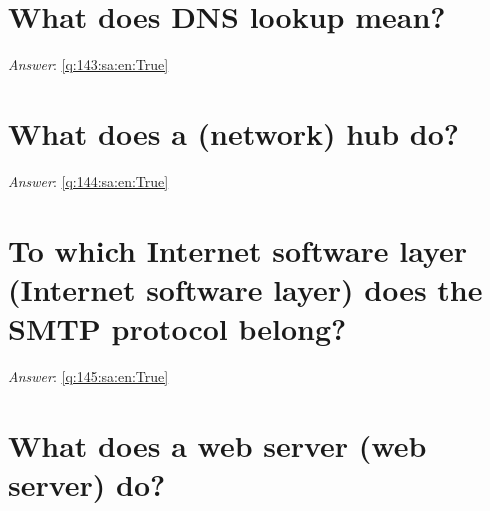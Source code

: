\documentclass[a4paper,11pt,oneside]{book}
\begin{document}
\begin{sloppypar}
\section{What does DNS lookup mean?}

\label{q:143:sa:en:False}

\vspace{2cm}

\noindent\makebox[\textwidth]{\hrulefill}

\vspace{1cm}

\textit{Answer}: \autoref{q:143:sa:en:True}



\section{What does a (network) hub do?}

\label{q:144:sa:en:False}

\vspace{2cm}

\noindent\makebox[\textwidth]{\hrulefill}

\vspace{1cm}

\textit{Answer}: \autoref{q:144:sa:en:True}



\section{To which Internet software layer (Internet software layer) does the SMTP protocol belong?}

\label{q:145:sa:en:False}

\vspace{2cm}

\noindent\makebox[\textwidth]{\hrulefill}

\vspace{1cm}

\textit{Answer}: \autoref{q:145:sa:en:True}



\section{What does a web server (web server) do?}

\label{q:146:sa:en:False}

\vspace{2cm}

\noindent\makebox[\textwidth]{\hrulefill}


\end{sloppypar}
\end{document}
